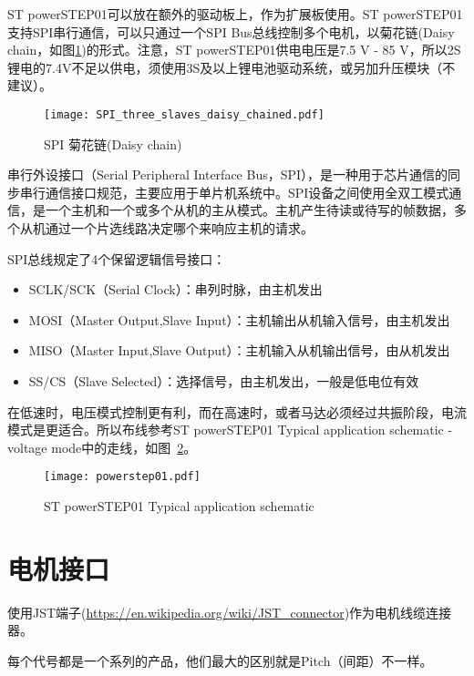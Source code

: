 ST powerSTEP01可以放在额外的驱动板上，作为扩展板使用。ST powerSTEP01支持SPI串行通信，可以只通过一个SPI Bus总线控制多个电机，以菊花链(Daisy chain，如图\ref{fig:SPI_three_slaves_daisy_chained})的形式。注意，ST powerSTEP01供电电压是7.5 V - 85 V，所以2S锂电的7.4V不足以供电，须使用3S及以上锂电池驱动系统，或另加升压模块（不建议）。

\begin{figure}[htbp]
    \centering
    \texttt{[image: SPI\_three\_slaves\_daisy\_chained.pdf]}
    \caption{SPI 菊花链(Daisy chain)}
    \label{fig:SPI_three_slaves_daisy_chained}
\end{figure}

串行外设接口（Serial Peripheral Interface Bus，SPI），是一种用于芯片通信的同步串行通信接口规范，主要应用于单片机系统中。SPI设备之间使用全双工模式通信，是一个主机和一个或多个从机的主从模式。主机产生待读或待写的帧数据，多个从机通过一个片选线路决定哪个来响应主机的请求。

SPI总线规定了4个保留逻辑信号接口：

\begin{itemize}
    \item SCLK/SCK（Serial Clock）：串列时脉，由主机发出
    \item MOSI（Master Output,Slave Input）：主机输出从机输入信号，由主机发出
    \item MISO（Master Input,Slave Output）：主机输入从机输出信号，由从机发出
    \item SS/CS（Slave Selected）：选择信号，由主机发出，一般是低电位有效
\end{itemize}

在低速时，电压模式控制更有利，而在高速时，或者马达必须经过共振阶段，电流模式是更适合。所以布线参考ST powerSTEP01 Typical application schematic - voltage mode中的走线，如图~\ref{fig:powerstep01}。

\begin{figure}[htbp]
    \centering
    \texttt{[image: powerstep01.pdf]}
    \caption{ST powerSTEP01 Typical application schematic}
    \label{fig:powerstep01}
\end{figure}

\section{电机接口}

使用JST端子(\url{https://en.wikipedia.org/wiki/JST_connector})作为电机线缆连接器。

每个代号都是一个系列的产品，他们最大的区别就是Pitch（间距）不一样。

